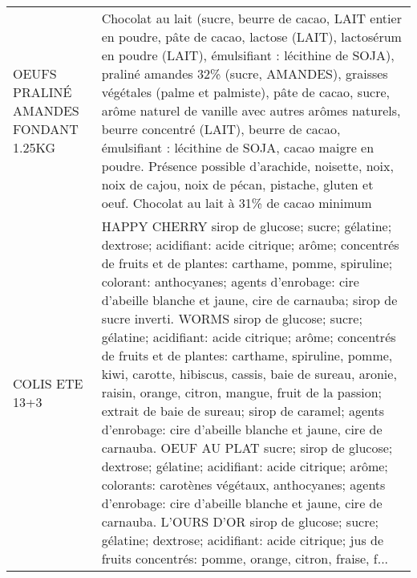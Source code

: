 \begin{longtable}{p{5cm}p{10cm}}
                                                                     OEUFS PRALINÉ AMANDES FONDANT 1.25KG &                                                                                                                                                                                                                                                                                                                                                                                                                                                              Chocolat au lait (sucre, beurre de cacao, LAIT entier en poudre, pâte de cacao, lactose (LAIT), lactosérum en poudre (LAIT), émulsifiant : lécithine de SOJA), praliné amandes 32\% (sucre, AMANDES), graisses végétales (palme et palmiste), pâte de cacao, sucre, arôme naturel de vanille avec autres arômes naturels, beurre concentré (LAIT), beurre de cacao, émulsifiant : lécithine de SOJA, cacao maigre en poudre.  Présence possible d'arachide, noisette, noix, noix de cajou, noix de pécan, pistache, gluten et oeuf.  Chocolat au lait à 31\% de cacao minimum \\
                                                                                           COLIS ETE 13+3 &  HAPPY CHERRY  sirop de glucose; sucre; gélatine; dextrose; acidifiant: acide citrique; arôme; concentrés de fruits et de plantes: carthame, pomme, spiruline; colorant: anthocyanes; agents d'enrobage: cire d'abeille blanche et jaune, cire de carnauba; sirop de sucre inverti.  WORMS  sirop de glucose; sucre; gélatine; acidifiant: acide citrique; arôme; concentrés de fruits et de plantes: carthame, spiruline, pomme, kiwi, carotte, hibiscus, cassis, baie de sureau, aronie, raisin, orange, citron, mangue, fruit de la passion; extrait de baie de sureau; sirop de caramel; agents d'enrobage: cire d'abeille blanche et jaune, cire de carnauba.  OEUF AU PLAT  sucre; sirop de glucose; dextrose; gélatine; acidifiant: acide citrique; arôme; colorants: carotènes végétaux, anthocyanes; agents d'enrobage: cire d'abeille blanche et jaune, cire de carnauba.  L'OURS D'OR  sirop de glucose; sucre; gélatine; dextrose; acidifiant: acide citrique; jus de fruits concentrés: pomme, orange, citron, fraise, f... \\

\end{longtable}
